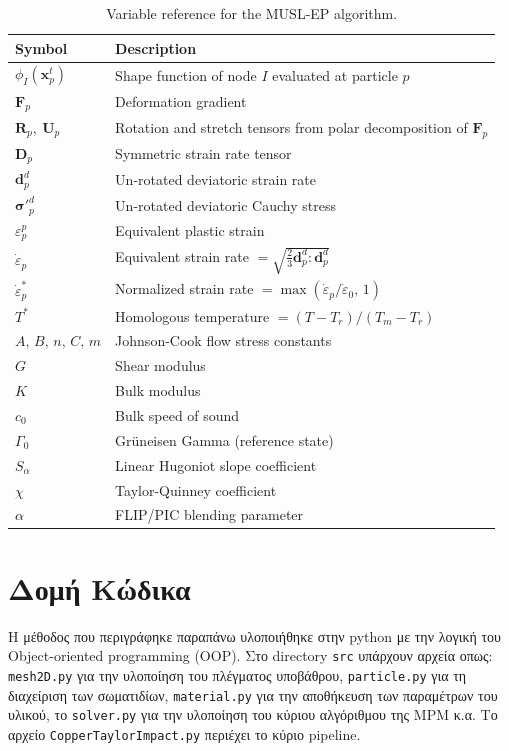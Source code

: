 \documentclass[12pt,a4paper]{report}
\begin{document}
	\begin{table}[H]
	\centering
	\begin{tabular}{ll}
	\toprule
	\textbf{Symbol} & \textbf{Description} \\
	\midrule
	$\phi_I(\mathbf{x}_p^t)$ & Shape function of node $I$ evaluated at particle $p$ \\
	$\mathbf{F}_p$ & Deformation gradient \\
	$\mathbf{R}_p,\ \mathbf{U}_p$ & Rotation and stretch tensors from polar decomposition of $\mathbf{F}_p$ \\
	$\mathbf{D}_p$ & Symmetric strain rate tensor \\
	$\mathbf{d}_p^d$ & Un-rotated deviatoric strain rate \\
	${\boldsymbol{\sigma}'}^d_p$ & Un-rotated deviatoric Cauchy stress \\
	$\varepsilon_p^p$ & Equivalent plastic strain \\
	$\dot{\varepsilon}_p$ & Equivalent strain rate $= \sqrt{\tfrac{2}{3}\mathbf{d}_p^d:\mathbf{d}_p^d}$ \\
	$\dot{\varepsilon}_p^*$ & Normalized strain rate $= \max(\dot{\varepsilon}_p / \dot{\varepsilon}_0,\,1)$ \\
	$T^*$ & Homologous temperature $= (T - T_r)/(T_m - T_r)$ \\
	$A,\,B,\,n,\,C,\,m$ & Johnson-Cook flow stress constants \\
	$G$ & Shear modulus \\
	$K$ & Bulk modulus \\
	$c_0$ & Bulk speed of sound \\
	$\Gamma_0$ & Grüneisen Gamma (reference state) \\
	$S_\alpha$ & Linear Hugoniot slope coefficient \\
	$\chi$ & Taylor-Quinney coefficient \\
	$\alpha$ & FLIP/PIC blending parameter \\
	\bottomrule
	\end{tabular}
	\caption{Variable reference for the MUSL-EP algorithm.}
	\end{table}

	\newpage
	\section{Δομή Κώδικα}
	Η μέθοδος που περιγράφηκε παραπάνω υλοποιήθηκε στην python με την λογική του Object-oriented programming (OOP). Στο directory \texttt{src} υπάρχουν αρχεία οπως: \texttt{mesh2D.py} για την υλοποίηση του πλέγματος υποβάθρου, \texttt{particle.py} για τη διαχείριση των σωματιδίων, \texttt{material.py} για την αποθήκευση των παραμέτρων του υλικού, το \texttt{solver.py} για την υλοποίηση του κύριου αλγόριθμου της MPM κ.α. Το αρχείο \texttt{CopperTaylorImpact.py} περιέχει το κύριο pipeline.
\end{document}

